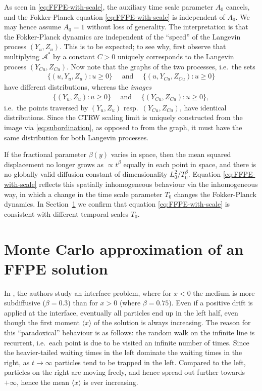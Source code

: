 \documentclass[a4paper,12pt]{elsarticle}
\numberwithin{equation}{section}
\theoremstyle{plain}
\theoremstyle{definition}
\theoremstyle{remark}
\numberwithin{equation}{section}
\newcommand{\1}{\mathbf 1}
\begin{document}
As seen in \eqref{eq:FFPE-with-scale}, the auxiliary time scale parameter 
$A_0$ cancels, and the Fokker-Planck equation \eqref{eq:FFPE-with-scale}
is independent of $A_0$. 
We may hence assume $A_0 = 1$ without loss of generality. 
The interpretation is that the
Fokker-Planck dynamics are independent of the ``speed'' of the Langevin process
$(Y_u, Z_u)$.  This is to be expected; to see why, first observe that
multiplying $\mathcal A^*$ by a constant $C > 0$ uniquely corresponds to the
Langevin process $(Y_{Cu}, Z_{Cu})$. 
Now note that the graphs of the two processes, i.e.\ the sets
\begin{align*}
\{(u, Y_u, Z_u): u \ge 0\} \quad \text{ and } \quad 
\{(u, Y_{Cu}, Z_{Cu}): u \ge 0\}
\end{align*}
have different distributions, whereas the \emph{images}
\begin{align*}
\{(Y_u, Z_u): u \ge 0\} \quad \text{ and } \quad 
\{(Y_{Cu}, Z_{Cu}): u \ge 0\},
\end{align*}
i.e.\ the points traversed by $(Y_u,Z_u)$ resp.\ $(Y_{Cu}, Z_{Cu})$, 
have identical distributions. 
Since the CTRW scaling limit is uniquely constructed from the image via 
\eqref{eq:subordination},
as opposed to from the graph,
it must have the same distribution for both Langevin processes.

If the fractional parameter $\beta(y)$ varies in space, then the mean squared displacement no longer grows as $\propto t^\beta$ equally in each point in space, and 
there is no globally valid diffusion constant of dimensionality $L_0^2 / T_0^\beta$.  
Equation
\eqref{eq:FFPE-with-scale} reflects this spatially inhomogeneous behaviour
via the inhomogeneous way, in which a change in the time scale parameter
$T_0$ changes the Fokker-Planck dynamics.
In Section~\ref{sec:examples}
we confirm that equation \eqref{eq:FFPE-with-scale} is consistent with 
different temporal scales $T_0$. 


\section{Monte Carlo approximation of an FFPE solution}
\label{sec:examples}

In \cite{Korabel2010}, the authors study an interface problem, where for 
$x<0$ the medium is more subdiffusive ($\beta = 0.3$) than for $x>0$ 
(where $\beta = 0.75$).  Even if a positive drift is applied at the 
interface, eventually all particles end up in the left half, even though 
the first moment $\langle x \rangle$ of the solution is always increasing. 
The reason for this ``paradoxical'' behaviour is as follows: the random 
walk on the infinite line is recurrent, i.e.\ each point is due to be 
visited an infinite number of times. Since the heavier-tailed waiting 
times in the left dominate the waiting times in the right, as $t \to 
\infty$ particles tend to be trapped in the left. Compared to the left, 
particles on the right are moving freely, and hence spread out further 
towards $+\infty$, hence the mean $\langle x \rangle$ is ever increasing. 
\end{document}
